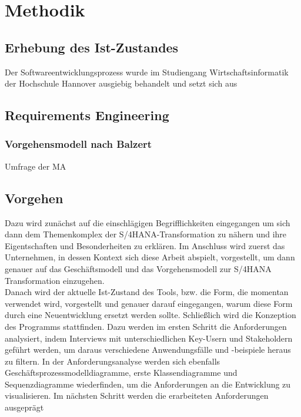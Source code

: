 \section{Methodik}
\subsection{Erhebung des Ist-Zustandes}
Der Softwareentwicklungsprozess wurde im Studiengang Wirtschaftsinformatik der Hochschule Hannover ausgiebig behandelt und setzt sich aus 





\subsection{Requirements Engineering}
\subsubsection{Vorgehensmodell nach Balzert}
Umfrage der MA
\subsection{Vorgehen}
Dazu wird zunächst auf die einschlägigen Begrifflichkeiten eingegangen um sich dann dem Themenkomplex der S/4HANA-Transformation zu nähern und ihre Eigentschaften und Besonderheiten zu erklären. Im Anschluss wird zuerst das Unternehmen, in dessen Kontext sich diese Arbeit abspielt, vorgestellt, um dann genauer auf das Geschäftsmodell und das Vorgehensmodell zur S/4HANA Transformation einzugehen. \\
Danach wird der aktuelle Ist-Zustand des Tools, bzw. die Form, die momentan verwendet wird, vorgestellt und genauer darauf eingegangen, warum diese Form durch eine Neuentwicklung ersetzt werden sollte. Schließlich wird die Konzeption des Programms stattfinden. Dazu werden im ersten Schritt die Anforderungen analysiert, indem Interviews mit unterschiedlichen Key-Usern und Stakeholdern geführt werden, um daraus verschiedene Anwendungsfälle und -beispiele heraus zu filtern. In der Anforderungsanalyse werden sich ebenfalls Geschäftsprozessmodelldiagramme, erste Klassendiagramme und Sequenzdiagramme wiederfinden, um die Anforderungen an die Entwicklung zu visualisieren. Im nächsten Schritt werden die erarbeiteten Anforderungen ausgeprägt
